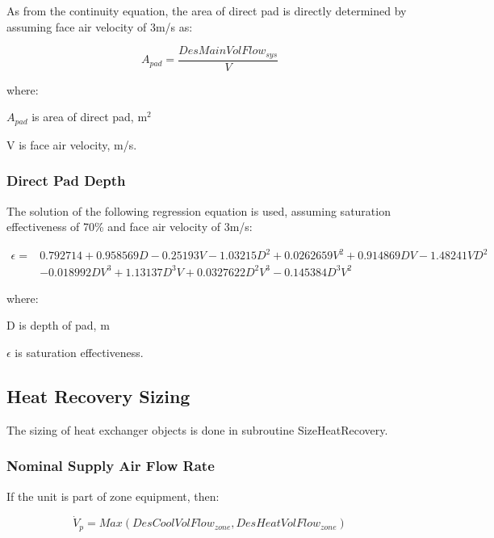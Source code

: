 As from the continuity equation, the area of direct pad is directly determined by assuming face air velocity of 3m/s as:

\begin{equation}
{A_{pad}} = \frac{{DesMainVolFlo{w_{sys}}}}{V}
\end{equation}

where:

\(A_{pad}\) is area of direct pad, m$^{2}$

V is face air velocity, m/s.


\subsubsection{Direct Pad Depth}\label{direct-pad-depth}

The solution of the following regression equation is used, assuming saturation effectiveness of 70\% and face air velocity of 3m/s:

\begin{equation}
\begin{split}
\epsilon =& 0.792714 + 0.958569D - 0.25193V - 1.03215D^2 + 0.0262659V^2 + 0.914869DV - 1.48241VD^2 \\
&- 0.018992 D V^3 + 1.13137D^3V + 0.0327622 D^2V^3 - 0.145384D^3 V^2
\end{split}
\end{equation}

where:

D is depth of pad, m

\(\epsilon\) is saturation effectiveness.


\subsection{Heat Recovery Sizing}\label{heat-recovery-sizing}

The sizing of heat exchanger objects is done in subroutine SizeHeatRecovery.

\subsubsection{Nominal Supply Air Flow Rate}\label{nominal-supply-air-flow-rate}

If the unit is part of zone equipment, then:

\begin{equation}
{\dot V_p} = Max\left( {DesCoolVolFlo{w_{zone}},DesHeatVolFlo{w_{zone}}} \right)
\end{equation}

